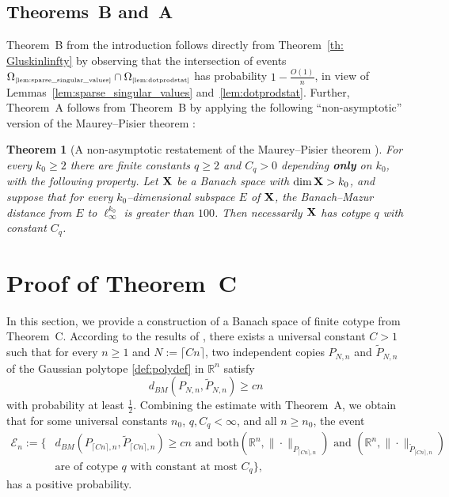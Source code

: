 \documentclass[11pt]{amsart}
\newtheorem{theorem}{Theorem}[section]
\theoremstyle{definition}
\theoremstyle{plain}
\newcommand{\R}{\mathbb{R}}
\newcommand{\Event}{\mathcal{E}}
\def\R{{\mathbb R}}
\def\Event{{\mathcal E}}
\begin{document}
\subsection{Theorems~B and~A}

Theorem~B from the introduction follows directly
from Theorem~\ref{th: Gluskinlinfty}
by observing that the intersection of events
$\Omega_{\text{\tiny\ref{lem:sparse_singular_values}}}
\cap \Omega_{\text{\tiny\ref{lem:dotprodstat}}}$
has probability $1-\frac{O(1)}{n}$, in view of Lemmas~\ref{lem:sparse_singular_values} 
and~\ref{lem:dotprodstat}.
Further, Theorem~A follows from Theorem~B by applying the following
``non-asymptotic'' version of the Maurey--Pisier theorem \cite{MP76}:

\begin{theorem}[A non-asymptotic restatement of the Maurey--Pisier theorem \cite{MP76}]\label{prop: na}
For every $k_0\geq 2$ there are finite constants $q\geq 2$ and $C_q>0$
depending {\bf only} on $k_0$, with the following property.
Let ${\bf X}$ be a Banach space with $\dim {\bf X}> k_0$, and suppose that
for every $k_0$--dimensional subspace $E$ of ${\bf X}$,
the Banach--Mazur distance from $E$ to $\ell_\infty^{k_0}$ is greater than $100$.
Then
necessarily ${\bf X}$ has cotype $q$ with constant $C_q$.
\end{theorem}



\section{Proof of Theorem~C}

In this section, we provide a construction of
a Banach space of finite cotype from Theorem~C.
According to the results of
\cite{Gluskin,LGl}, there exists a universal constant
$C>1$ such that for every $n\geq 1$
and $N:=\lceil Cn\rceil$,
two independent copies $P_{N,n}$ and $\tilde P_{N,n}$
of the Gaussian polytope \eqref{def:polydef} in $\R^n$
satisfy
$$
d_{BM}(P_{N,n},\tilde P_{N,n})\geq cn
$$
with probability at least $\frac{1}{2}$.
Combining the estimate with Theorem~A,
we obtain that for 
some universal constants $n_0$, $q,C_q<\infty$, and
all $n\geq n_0$,
the event
\begin{align*}
\Event_{n}:=\Big\{&d_{BM}(P_{\lceil Cn\rceil,n},
\tilde P_{\lceil Cn\rceil,n})\geq cn\mbox{ and both
$(\R^n,\|\cdot\|_{P_{\lceil Cn\rceil,n}})$ 
and $(\R^n,\|\cdot\|_{\tilde P_{\lceil Cn\rceil,n}})$}\\
&\mbox{are of cotype $q$ with constant at most $C_q$}
\Big\},
\end{align*}
has a positive probability.
\end{document}
